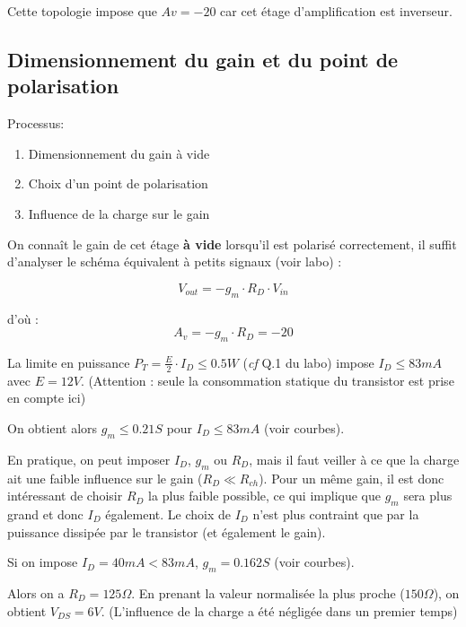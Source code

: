 \documentclass[11pt,a4paper]{article}
\theoremstyle{definition}%
\begin{document}
{	Cette topologie impose que $Av=-20$ car cet étage d'amplification est inverseur.


\subsection{Dimensionnement du gain et du point de polarisation}
Processus:
\begin{enumerate}
\item Dimensionnement du gain à vide
\item Choix d'un point de polarisation
\item Influence de la charge sur le gain
\end{enumerate}

On connaît le gain de cet étage\textbf{ à vide }lorsqu'il est polarisé correctement, il suffit d'analyser le schéma équivalent à petits signaux (voir labo) :

$$V_{out}=-g_m\cdot  R_D \cdot V_{in}$$

d'où : $$A_v=-g_m\cdot  R_D =-20$$


La limite en puissance $P_T=\frac{E}{2}\cdot I_D\leq0.5W$ (\textit{cf} Q.1 du labo) impose $I_D\leq 83mA$ avec $E=12V$. (Attention : seule la consommation statique du transistor est prise en compte ici)

On obtient alors $g_m\leq0.21S$ pour $I_D\leq83mA$ (voir courbes).

En pratique, on peut imposer $I_D$, $g_m$ ou $R_D$, mais il faut veiller à ce que la charge ait une faible influence sur le gain ($R_{D}\ll R_{ch}$). Pour un même gain, il est donc intéressant de choisir $R_D$ la plus faible possible, ce qui implique que $g_m$ sera plus grand et donc $I_D$ également. Le choix de $I_D$ n'est plus contraint que par la puissance dissipée par le transistor (et également le gain).

Si on impose $I_D=40mA<83mA$, $g_m=0.162S$ (voir courbes).

Alors on a $R_D=125\Omega$. En prenant la valeur normalisée la plus proche ($150\Omega$), on obtient $V_{DS}=6V$. %
(L'influence de la charge a été négligée dans un premier temps)

}
\end{document}
